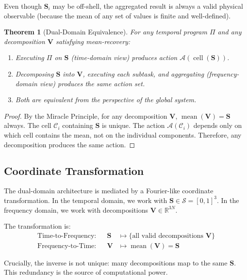 \documentclass[twocolumn,11pt,a4paper]{article}
\newtheorem{theorem}{Theorem}[section]
\newcommand{\Stuple}{\mathbf{S}}
\newcommand{\calC}{\mathcal{C}}
\DeclareMathOperator{\cell}{cell}
\DeclareMathOperator{\mean}{mean}
\begin{document}
Even though $\Stuple_i$ may be off-shell, the aggregated result is always a valid physical observable (because the mean of any set of values is finite and well-defined).

\begin{theorem}[Dual-Domain Equivalence]
For any temporal program $\Pi$ and any decomposition $\mathbf{V}$ satisfying mean-recovery:
\begin{enumerate}[nosep,label=(\roman*)]
  \item Executing $\Pi$ on $\Stuple$ (time-domain view) produces action $\mathcal{A}(\cell(\Stuple))$.
  \item Decomposing $\Stuple$ into $\mathbf{V}$, executing each subtask, and aggregating (frequency-domain view) produces the same action set.
  \item Both are equivalent from the perspective of the global system.
\end{enumerate}
\end{theorem}

\begin{proof}
By the Miracle Principle, for any decomposition $\mathbf{V}$, $\mean(\mathbf{V}) = \Stuple$ always. The cell $\calC_i$ containing $\Stuple$ is unique. The action $\mathcal{A}(\calC_i)$ depends only on which cell contains the mean, not on the individual components. Therefore, any decomposition produces the same action.
\end{proof}



\subsection{Coordinate Transformation}

The dual-domain architecture is mediated by a Fourier-like coordinate transformation. In the temporal domain, we work with $\Stuple \in \mathcal{S} = [0,1]^3$. In the frequency domain, we work with decompositions $\mathbf{V} \in \mathbb{R}^{3N}$.

The transformation is:
\begin{align}
\text{Time-to-Frequency}: && \Stuple &\mapsto \{\text{all valid decompositions } \mathbf{V}\}\\
\text{Frequency-to-Time}: && \mathbf{V} &\mapsto \mean(\mathbf{V}) = \Stuple
\end{align}

Crucially, the inverse is not unique: many decompositions map to the same $\Stuple$. This redundancy is the source of computational power.
\end{document}
